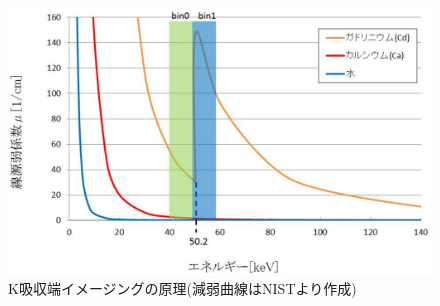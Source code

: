 \begin{figure}[H]
 \begin{center}
 \includegraphics[width=12cm]{image/other/k-edge.eps}
 \end{center}
 \vspace{-0.7cm}
 \caption{K吸収端イメージングの原理(減弱曲線はNIST\cite{nist}より作成)}
 \label{fig:k-edge}
\end{figure}









